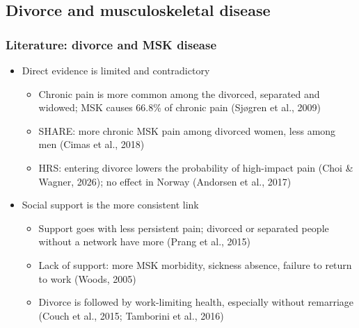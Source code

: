 \documentclass[t,20pt]{beamer}
\newcommand{\ct}[1]{{\color{BiBBlau80}(#1)}}                        %
\begin{document}
\subsection{Divorce and musculoskeletal disease}
\begin{bibframe}
  \frametitle{Literature: divorce and MSK disease}
  \begin{itemize}
    \item Direct evidence is limited and contradictory
    \begin{itemize}
      \item Chronic pain is more common among the divorced, separated and widowed; MSK causes 66.8\% of chronic pain \ct{Sjøgren et al., 2009}
      \item SHARE: more chronic MSK pain among divorced women, less among men \ct{Cimas et al., 2018}
      \item HRS: entering divorce lowers the probability of high-impact pain \ct{Choi \& Wagner, 2026}; no effect in Norway \ct{Andorsen et al., 2017}
    \end{itemize}
    \item Social support is the more consistent link
    \begin{itemize}
      \item Support goes with less persistent pain; divorced or separated people without a network have more \ct{Prang et al., 2015}
      \item Lack of support: more MSK morbidity, sickness absence, failure to return to work \ct{Woods, 2005}
      \item Divorce is followed by work-limiting health, especially without remarriage \ct{Couch et al., 2015; Tamborini et al., 2016}
    \end{itemize}
  \end{itemize}
\end{bibframe}
\end{document}
